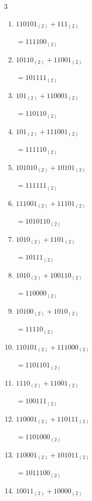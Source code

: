 \begin{multicols}{3}
\begin{enumerate}
        $=101010_{(2)}$

  \item $110101_{(2)} + 111_{(2)}$

        $=111100_{(2)}$

  \item $10110_{(2)} + 11001_{(2)}$

        $=101111_{(2)}$

  \item $101_{(2)} + 110001_{(2)}$

        $=110110_{(2)}$

  \item $101_{(2)} + 111001_{(2)}$

        $=111110_{(2)}$

\columnbreak %

\resetques

  \item $101010_{(2)} + 10101_{(2)}$

        $=111111_{(2)}$

  \item $111001_{(2)} + 11101_{(2)}$

        $=1010110_{(2)}$

  \item $1010_{(2)} + 1101_{(2)}$

        $=10111_{(2)}$

  \item $1010_{(2)} + 100110_{(2)}$

        $=110000_{(2)}$

  \item $10100_{(2)} + 1010_{(2)}$

        $=11110_{(2)}$

  \item $110101_{(2)} + 111000_{(2)}$

        $=1101101_{(2)}$

  \item $1110_{(2)} + 11001_{(2)}$

        $=100111_{(2)}$

  \item $110001_{(2)} + 110111_{(2)}$

        $=1101000_{(2)}$

  \item $110001_{(2)} + 101011_{(2)}$

        $=1011100_{(2)}$

  \item $10011_{(2)} + 10000_{(2)}$


\end{enumerate}
\end{multicols}
